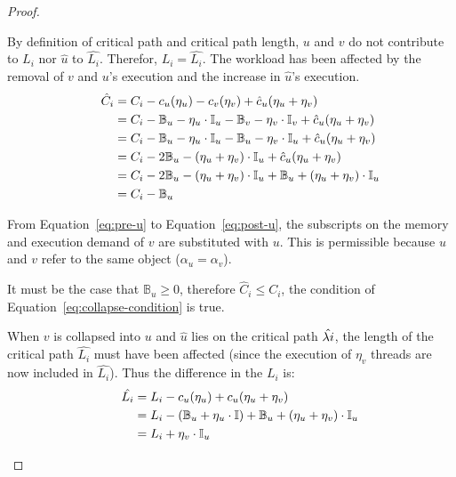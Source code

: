 \begin{theorem}
\begin{proof}
    \begin{case} By
      definition of critical path and critical path length, ${u}$ and
      ${v}$ do not contribute to ${L_i}$ nor ${\hat{u}}$ to
      ${\hat{L_i}}$. Therefor, ${L_i = \hat{L_i}}$. The
      workload has been affected by the removal of ${v}$ and ${u}$'s
      execution  and the increase in ${\hat{u}}$'s execution. 
      \begin{align}
        \indent
        \hat{C}_i &= C_i - c_u(\eta_u) - c_v(\eta_v) +
        \hat{c}_u(\eta_u + \eta_v) \\
        &= C_i - \mathbb{B}_u - \eta_u \cdot \mathbb{I}_u
            - \mathbb{B}_v - \eta_v \cdot \mathbb{I}_v +
            \hat{c}_u(\eta_u + \eta_v)
            \label{eq:pre-u} \\
        &= C_i - \mathbb{B}_u - \eta_u \cdot \mathbb{I}_u
            - \mathbb{B}_u - \eta_v \cdot \mathbb{I}_u +
            \hat{c}_u(\eta_u + \eta_v)
            \label{eq:post-u} \\
        &= C_i -2\mathbb{B}_u - (\eta_u + \eta_v)\cdot \mathbb{I}_u +
            \hat{c}_u(\eta_u + \eta_v) \\
        &= C_i -2\mathbb{B}_u - (\eta_u + \eta_v)\cdot \mathbb{I}_u +
            \mathbb{B}_u + (\eta_u + \eta_v)\cdot \mathbb{I}_u \\
        &= C_i - \mathbb{B}_u
      \end{align}

      From Equation~\ref{eq:pre-u} to Equation~\ref{eq:post-u}, the
      subscripts on the memory and execution demand of ${v}$ are
      substituted with ${u}$. This is permissible because ${u}$ and
      ${v}$ refer to the same object (${\alpha_u = \alpha_v}$).

      It must be the case that ${\mathbb{B}_u \ge 0}$, therefore
      ${\hat{C}_i \le C_i}$, the condition of
      Equation~\ref{eq:collapse-condition} is true.
    \end{case}

    \begin{case} When ${v}$ is
      collapsed into ${u}$ and ${\hat{u}}$ lies on the critical path
      ${\hat{\lambda{i}}}$, the length of the critical path
      ${\hat{L_i}}$ must have been affected (since the
      execution of ${\eta_v}$ threads are now included in
      ${\hat{L_i}}$). Thus the difference in the ${L_i}$ is:
      \begin{align*}
        \indent
        \hat{L_i} &= L_i - c_u(\eta_u) + c_u(\eta_u + \eta_v) \\
        &= L_i - (\mathbb{B}_u + \eta_u \cdot \mathbb{I}) +
            \mathbb{B}_u + (\eta_u + \eta_v) \cdot \mathbb{I}_u \\
        &= L_i + \eta_v \cdot \mathbb{I}_u
      \end{align*}



\end{case}
\end{proof}
\end{theorem}
